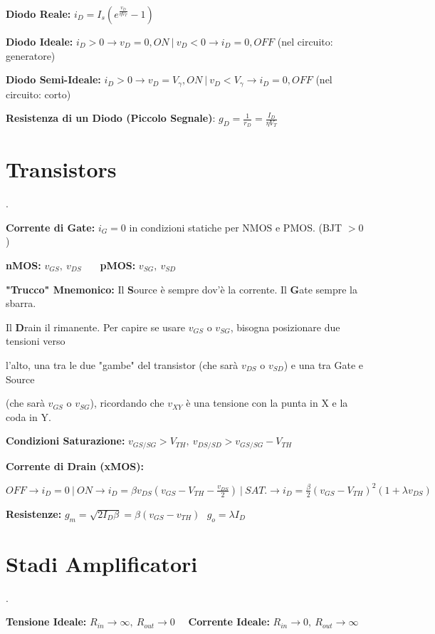 \documentclass[12pt]{extarticle}
\begin{document}
{\bf Diodo Reale:} $\displaystyle i_D = I_s(e^{\frac{v_D}{\eta V_T}}- 1)$

{\bf Diodo Ideale:} $i_D > 0 \to v_D = 0, ON \ \big | \ v_D < 0 \to i_D = 0, OFF $ (nel circuito: generatore)

{\bf Diodo Semi-Ideale:} $i_D > 0 \to v_D = V_\gamma, ON \ \big | \ v_D < V_\gamma \to i_D = 0, OFF$ (nel circuito: corto)

{\bf Resistenza di un Diodo (Piccolo Segnale)}: $\displaystyle g_D = \frac{1}{r_D} = \frac{I_D}{\eta V_T}$

\section{Transistors}.

{\bf Corrente di Gate:} $i_G = 0$ in condizioni statiche per NMOS e PMOS. (BJT $> 0$)

{\bf nMOS:} $\displaystyle v_{GS}, \ v_{DS}$ \ \ \ {\bf pMOS:} $\displaystyle v_{SG}, \ v_{SD}$

{\bf "Trucco" Mnemonico:} Il {\bf S}ource è sempre dov'è la corrente. Il {\bf G}ate sempre la sbarra.

Il {\bf D}rain il rimanente. Per capire se usare $v_{GS}$ o $v_{SG}$, bisogna posizionare due tensioni verso

l'alto, una tra le due "gambe" del transistor (che sarà $v_{DS}$ o $v_{SD}$) e una tra Gate e Source

(che sarà $v_{GS}$ o $v_{SG}$), ricordando che $v_{XY}$ è una tensione con la punta in X e la coda in Y.

{\bf Condizioni Saturazione:} $\displaystyle v_{GS/SG} > V_{TH}, \ v_{DS/SD} > v_{GS/SG} - V_{TH} $

{\bf Corrente di Drain (xMOS):} 

$\displaystyle OFF \to i_D = 0 \ \big | \  ON \to i_D = \beta v_{DS}(v_{GS}-V_{TH}-\frac{v_{DS}}{2}) \ \big | \ SAT. \to i_D = \frac{\beta}{2}(v_{GS}-V_{TH})^2(1+\lambda v_{DS})$

{\bf Resistenze:} $\displaystyle g_m = \sqrt{2I_D\beta} = \beta(v_{GS}-v_{TH})\ \ \ g_o = \lambda I_D$

\section{Stadi Amplificatori}.

{\bf Tensione Ideale:} $R_{in} \to \infty, \ R_{out} \to 0 $ \ \ {\bf Corrente Ideale:} $R_{in} \to 0, \ R_{out} \to \infty $ 
\end{document}
